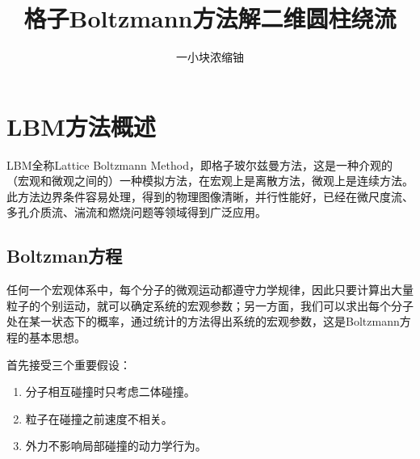 \documentclass[fontset=fandol]{ctexart}
\numberwithin{equation}{section} %
\begin{document}
\title{\heiti 格子Boltzmann方法解二维圆柱绕流}

\author{一小块浓缩铀}

\date{\zhtoday}

\maketitle

\newpage
\section{LBM方法概述}
LBM全称Lattice Boltzmann Method，即格子玻尔兹曼方法，这是一种介观的（宏观和微观之间的）一种模拟方法，在宏观上是离散方法，微观上是连续方法。此方法边界条件容易处理，得到的物理图像清晰，并行性能好，已经在微尺度流、多孔介质流、湍流和燃烧问题等领域得到广泛应用。
\subsection{Boltzman方程}
任何一个宏观体系中，每个分子的微观运动都遵守力学规律，因此只要计算出大量粒子的个别运动，就可以确定系统的宏观参数；另一方面，我们可以求出每个分子处在某一状态下的概率，通过统计的方法得出系统的宏观参数，这是Boltzmann方程的基本思想。

首先接受三个重要假设：
\begin{enumerate}
    \item 分子相互碰撞时只考虑二体碰撞。
    \item 粒子在碰撞之前速度不相关。
    \item 外力不影响局部碰撞的动力学行为。
\end{enumerate}
\end{document}
